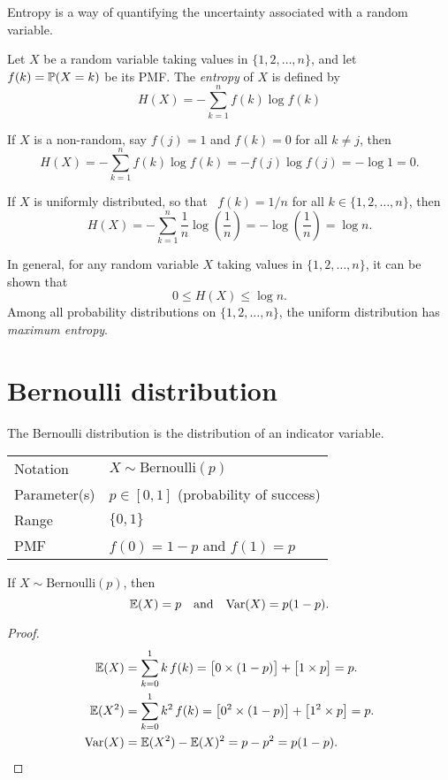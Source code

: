 \newpage
\begin{example}[Entropy]
Entropy is a way of quantifying the uncertainty associated with a random variable.

\smallskip
Let $X$ be a random variable taking values in $\{1,2,\ldots,n\}$, and let $f(k)=\mathbb{P}(X=k)$ be its PMF. The \emph{entropy} of $X$ is defined by
\[
H(X) = -\sum_{k=1}^n f(k)\log f(k)
\]

If $X$ is a non-random, say $f(j)=1$ and $f(k)=0$ for all $k\neq j$, then
\[
H(X) = -\sum_{k=1}^n f(k)\log f(k) = - f(j)\log f(j) = -\log 1 = 0.
\]

If $X$ is uniformly distributed, so that \ $f(k)=1/n$ for all $k\in\{1,2,\ldots,n\}$, then
\[
H(X) = -\sum_{k=1}^n \frac{1}{n}\log\left(\frac{1}{n}\right) = -\log\left(\frac{1}{n}\right) = \log n.
\]

In general, for any random variable $X$ taking values in $\{1,2,\ldots,n\}$, it can be shown that 
\[
0\leq H(X)\leq \log n.
\]
Among all probability distributions on $\{1,2,\ldots,n\}$, the uniform distribution has \emph{maximum entropy}.
\end{example}

\section{Bernoulli distribution}
The Bernoulli distribution is the distribution of an indicator variable.

\begin{center}
\begin{tabular}{ll}\hline
Notation			& $X\sim\text{Bernoulli}(p)$ \\
Parameter(s)		& $p \in [0,1]$ \quad (probability of success) \\
Range			& $\{0,1\}$ \\
PMF				& $f(0) = 1-p$ and $f(1) = p$ \\ \hline
\end{tabular}
\end{center}

\begin{lemma}
If $X\sim\text{Bernoulli}(p)$, then 
\[
\mathbb{E}(X)= p \quad\text{and}\quad \text{Var}(X) = p(1-p).
\]
\end{lemma}

\begin{proof}
\begin{align*}
\mathbb{E}(X) 
	& 	= \sum_{k=0}^1 k\,f(k)
	 	= \big[0\times(1-p)\big] + \big[1\times p\big]
		= p. \\
\mathbb{E}(X^2) 
	& 	= \sum_{k=0}^1 k^2\,f(k)
		= \big[0^2\times(1-p)\big] + \big[1^2\times p\big]
		= p. \\
\text{Var}(X)	
	& 	= \mathbb{E}(X^2)-\mathbb{E}(X)^2
		= p - p^2
		= p(1-p).
\end{align*}
\end{proof}

